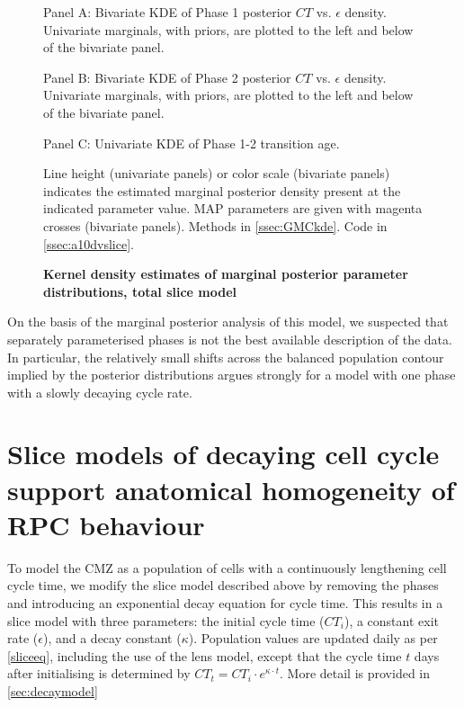 \begin{figure}[!h]
    \caption{{\bf Kernel density estimates of marginal posterior parameter distributions, total slice model}}
    Panel A: Bivariate KDE of Phase 1 posterior $CT$ vs. $\epsilon$ density. Univariate marginals, with priors, are plotted to the left and below of the bivariate panel.

    Panel B: Bivariate KDE of Phase 2 posterior $CT$ vs. $\epsilon$ density. Univariate marginals, with priors, are plotted to the left and below of the bivariate panel.

    Panel C: Univariate KDE of Phase 1-2 transition age.

    Line height (univariate panels) or color scale (bivariate panels) indicates the estimated marginal posterior density present at the indicated parameter value. MAP parameters are given with magenta crosses (bivariate panels).
    \label{dvmarginals}
    Methods in \autoref{ssec:GMCkde}.
    Code in \autoref{ssec:a10dvslice}.    
\end{figure}

On the basis of the marginal posterior analysis of this model, we suspected that separately parameterised phases is not the best available description of the data. In particular, the relatively small shifts across the balanced population contour implied by the posterior distributions argues strongly for a model with one phase with a slowly decaying cycle rate.

\FloatBarrier

\section{Slice models of decaying cell cycle support anatomical homogeneity of RPC behaviour}

To model the CMZ as a population of cells with a continuously lengthening cell cycle time, we modify the slice model described above by removing the phases and introducing an exponential decay equation for cycle time. This results in a slice model with three parameters: the initial cycle time ($CT_{i}$), a constant exit rate ($\epsilon$), and a decay constant ($\kappa$). Population values are updated daily as per \autoref{sliceeq}, including the use of the lens model, except that the cycle time $t$ days after initialising is determined by $CT_{t}=CT_{i} \cdot e^{\kappa \cdot t}$. More detail is provided in \autoref{sec:decaymodel}

